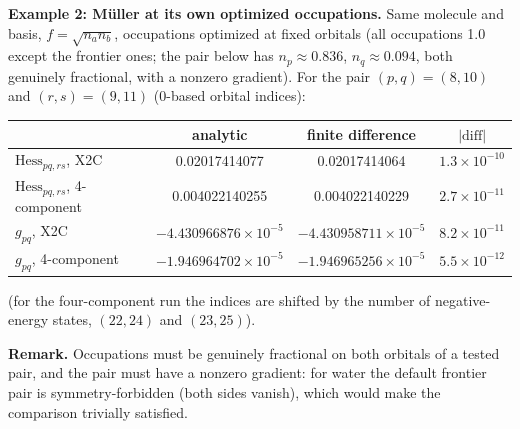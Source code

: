 \documentclass[11pt]{article}
\begin{document}
\medskip
\noindent\textbf{Example 2: M\"uller at its own optimized occupations.}
Same molecule and basis, $f=\sqrt{n_an_b}$, occupations optimized at fixed
orbitals (all occupations 1.0 except the frontier ones; the pair below has
$n_p\approx0.836$, $n_q\approx0.094$, both genuinely fractional, with a nonzero
gradient). For the pair $(p,q)=(8,10)$ and $(r,s)=(9,11)$ (0-based orbital indices):
\begin{center}
\begin{tabular}{lccc}
\hline
 & analytic & finite difference & $|\text{diff}|$ \\
\hline
$\mathrm{Hess}_{pq,rs}$, X2C          & 0.02017414077  & 0.02017414064  & $1.3\times10^{-10}$ \\
$\mathrm{Hess}_{pq,rs}$, 4-component  & 0.004022140255 & 0.004022140229 & $2.7\times10^{-11}$ \\
$g_{pq}$, X2C                          & $-4.430966876\times10^{-5}$ & $-4.430958711\times10^{-5}$ & $8.2\times10^{-11}$ \\
$g_{pq}$, 4-component                  & $-1.946964702\times10^{-5}$ & $-1.946965256\times10^{-5}$ & $5.5\times10^{-12}$ \\
\hline
\end{tabular}
\end{center}
(for the four-component run the indices are shifted by the number of
negative-energy states, $(22,24)$ and $(23,25)$).

\medskip
\noindent\textbf{Remark.} Occupations must be genuinely fractional on both
orbitals of a tested pair, and the pair must have a nonzero gradient: for water
the default frontier pair is symmetry-forbidden (both sides vanish), which
would make the comparison trivially satisfied.
\end{document}
